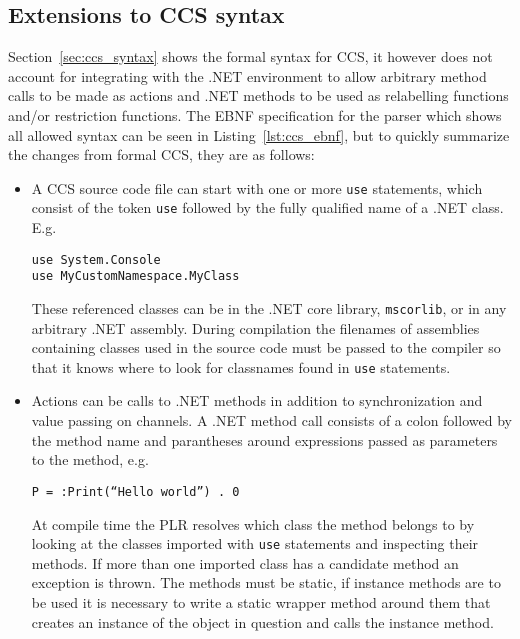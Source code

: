 \subsection{Extensions to CCS syntax}

	Section~\ref{sec:ccs_syntax} shows the formal syntax for CCS, it however 
	does not account for integrating with the .NET environment to allow 
	arbitrary method calls to be made as actions and .NET methods to be used as 
	relabelling functions and/or restriction functions. The EBNF specification 
	for the parser which shows all allowed syntax can be seen in 
	Listing~\ref{lst:ccs_ebnf}, but to quickly summarize the changes from formal 
	CCS, they are as follows:
	
	\begin{itemize}
		
		\item A CCS source code file can start with one or more \texttt{use} 
		statements, which consist of the token \texttt{use} followed by the fully 
		qualified name of a .NET class. E.g.
		
		\begin{center}\texttt{use System.Console\ \ \ \ \ \ \ \ \ \ \ \ \\\texttt{use MyCustomNamespace.MyClass}}\end{center}
		
		These referenced classes can be in the .NET core library, 
		\texttt{mscorlib}, or in any arbitrary .NET assembly. During compilation 
		the filenames of assemblies containing classes used in the source code 
		must be passed to the compiler so that it knows where to look for 
		classnames found in \texttt{use} statements.
	
		\item Actions can be calls to .NET methods in addition to synchronization 
		and value passing on channels. A .NET method call consists of a colon 
		followed by the method name and parantheses around expressions passed as 
		parameters to the method, e.g. 
		
		\begin{center}\texttt{P = :Print(``Hello world'') . 0}\end{center}
		
		At compile time the PLR resolves which class the method belongs to by 
		looking at the classes imported with \texttt{use} statements and 
		inspecting their methods. If more than one imported class has a candidate 
		method an exception is thrown. The methods must be static, if instance 
		methods are to be used it is necessary to write a static wrapper method 
		around them that creates an instance of the object in question and calls 
		the instance method.
		

\end{itemize}
